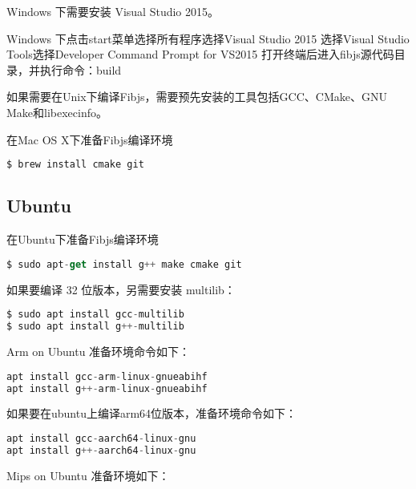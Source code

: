 Windows 下需要安装 Visual Studio 2015。


Windows 下点击start菜单选择所有程序选择Visual Studio 2015 选择Visual Studio Tools选择Developer Command Prompt for VS2015 打开终端后进入fibjs源代码目录，并执行命令：build




如果需要在Unix下编译Fibjs，需要预先安装的工具包括GCC、CMake、GNU Make和libexecinfo。


\begin{example}
在Mac OS X下准备Fibjs编译环境
\begin{lstlisting}[language=JavaScript]
$ brew install cmake git
\end{lstlisting}
\end{example}

\subsection{Ubuntu}


\begin{example}
在Ubuntu下准备Fibjs编译环境
\begin{lstlisting}[language=JavaScript]
$ sudo apt-get install g++ make cmake git
\end{lstlisting}
\end{example}


如果要编译 32 位版本，另需要安装 multilib：




\begin{lstlisting}[language=JavaScript]
$ sudo apt install gcc-multilib
$ sudo apt install g++-multilib
\end{lstlisting}


Arm on Ubuntu 准备环境命令如下：

\begin{lstlisting}[language=JavaScript]
apt install gcc-arm-linux-gnueabihf
apt install g++-arm-linux-gnueabihf
\end{lstlisting}



如果要在ubuntu上编译arm64位版本，准备环境命令如下：






\begin{lstlisting}[language=JavaScript]
apt install gcc-aarch64-linux-gnu
apt install g++-aarch64-linux-gnu
\end{lstlisting}


Mips on Ubuntu 准备环境如下：

